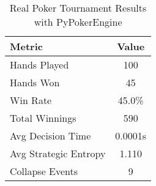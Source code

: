 \begin{table}[h]
\centering
\caption{Real Poker Tournament Results with PyPokerEngine}
\begin{tabular}{|l|c|}
\hline
Metric & Value \\
\hline
Hands Played & 100 \\
Hands Won & 45 \\
Win Rate & 45.0\% \\
Total Winnings & 590 \\
Avg Decision Time & 0.0001s \\
Avg Strategic Entropy & 1.110 \\
Collapse Events & 9 \\
\hline
\end{tabular}
\end{table}